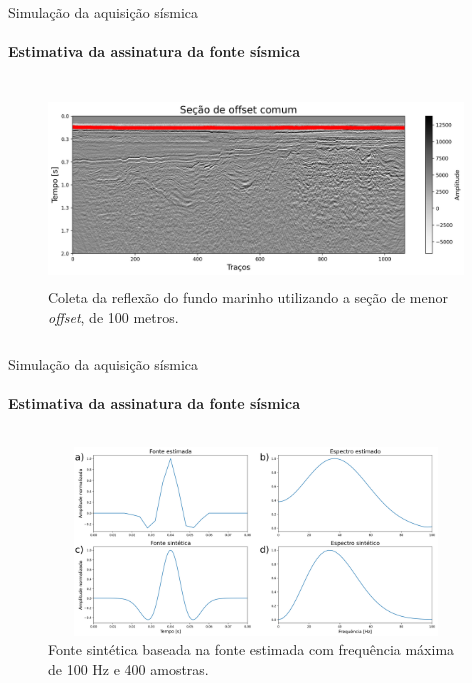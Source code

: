 \documentclass[xcolor=dvipsnames,t]{beamer}
\begin{document}
\begin{frame}{Simulação da aquisição sísmica}
\framesubtitle{Estimativa da assinatura da fonte sísmica}	
	
\begin{columns}[onlytextwidth, T]
	\begin{column}{.9\textwidth}
		\begin{figure}[h]
			\includegraphics[width=11cm,height=5cm]{../imagens/estimativaWavelet.png}	
			\tiny{\caption{Coleta da reflexão do fundo marinho utilizando a seção de menor \textit{offset}, de 100 metros.}} 	
		\end{figure}			
	\end{column}
\end{columns}	

\end{frame}
\begin{frame}{Simulação da aquisição sísmica}
	\framesubtitle{Estimativa da assinatura da fonte sísmica}	
	
	\begin{columns}[onlytextwidth, T]
		\begin{column}{.9\textwidth}
			\begin{figure}[h]
				\includegraphics[width=11cm,height=5cm]{../imagens/waveletsModeling.png}	
				\tiny{\caption{Fonte sintética baseada na fonte estimada com frequência máxima de 100 Hz e 400 amostras.}} 	
			\end{figure}			
		\end{column}
	\end{columns}	
	
\end{frame}
\end{document}

